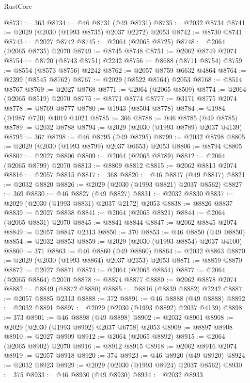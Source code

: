 \begin{lexlean}{RustCore}
\begin{coremodule}
@8731 := 363
@8734 := @46 @8731 (@49 @8731)
@8735 := @2032 @8734
@8741 := @2029 (@2030 (@1993 @8735) @2037 @2272) @2053
@8742 := @8730 @8741
@8743 := @2027 @8742
@8745 := @2064 (@2065 @8725)
@8748 := @2064 (@2065 @8735) @2070
@8749 := @8745 @8748
@8751 := @2062 @8749 @2074
@8754 := @8720 (@8743 @8751) @2242
@8756 := @8688 (@8711 @8754)
@8759 := @8554 (@8573 @8756) @2242
@8762 := @2057 @8759 @6632 @4864
@8764 := @2399 (@8545 @8762)
@8767 := @2029 (@8522 @8764) @2053
@8768 := @8514 @8767
@8769 := @2027 @8768
@8771 := @2064 (@2065 @8509)
@8774 := @2064 (@2065 @8519) @2070
@8775 := @8771 @8774
@8777 := @3171 @8775 @2074
@8778 := @8769 @8777
@8780 := @1943 (@8504 @8778)
@8784 := @1984 (@1987 @720) @4019 @4021
@8785 := 366
@8788 := @46 @8785 (@49 @8785)
@8789 := @2032 @8788
@8794 := @2029 (@2030 (@1993 @8789) @2037 @4139)
@8795 := 367
@8798 := @46 @8795 (@49 @8795)
@8799 := @2032 @8798
@8805 := @2029 (@2030 (@1993 @8799) @2037 @6653) @2053
@8806 := @8794 @8805
@8807 := @2027 @8806
@8809 := @2064 (@2065 @8789)
@8812 := @2064 (@2065 @8799) @2070
@8813 := @8809 @8812
@8815 := @2062 @8813 @2074
@8816 := @2057 @8815
@8817 := 368
@8820 := @46 @8817 (@49 @8817)
@8821 := @2032 @8820
@8826 := @2029 (@2030 (@1993 @8821) @2037 @8562)
@8827 := 369
@8830 := @46 @8827 (@49 @8827)
@8831 := @2032 @8830
@8837 := @2029 (@2030 (@1993 @8831) @2037 @2172) @2053
@8838 := @8826 @8837
@8839 := @2027 @8838
@8841 := @2064 (@2065 @8821)
@8844 := @2064 (@2065 @8831) @2070
@8845 := @8841 @8844
@8847 := @2062 @8845 @2074
@8849 := @2057 @8847 @2313
@8850 := 370
@8853 := @46 @8850 (@49 @8850)
@8854 := @2032 @8853
@8859 := @2029 (@2030 (@1993 @8854) @2037 @4100)
@8860 := 371
@8863 := @46 @8860 (@49 @8860)
@8864 := @2032 @8863
@8870 := @2029 (@2030 (@1993 @8864) @2037 @2353) @2053
@8871 := @8859 @8870
@8872 := @2027 @8871
@8874 := @2064 (@2065 @8854)
@8877 := @2064 (@2065 @8864) @2070
@8878 := @8874 @8877
@8880 := @2062 @8878 @2074
@8882 := @8849 (@8872 @8880)
@8885 := @8816 (@8839 @8882) @2242
@8887 := @2057 @8885 @2313
@8888 := 372
@8891 := @46 @8888 (@49 @8888)
@8892 := @2032 @8891
@8897 := @2029 (@2030 (@1993 @8892) @2037 @4139)
@8898 := 373
@8901 := @46 @8898 (@49 @8898)
@8902 := @2032 @8901
@8908 := @2029 (@2030 (@1993 @8902) @2037 @6758) @2053
@8909 := @8897 @8908
@8910 := @2027 @8909
@8912 := @2064 (@2065 @8892)
@8915 := @2064 (@2065 @8902) @2070
@8916 := @8912 @8915
@8918 := @2062 @8916 @2074
@8919 := @2057 @8918
@8920 := 374
@8923 := @46 @8920 (@49 @8920)
@8924 := @2032 @8923
@8929 := @2029 (@2030 (@1993 @8924) @2037 @8562)
@8930 := 375
@8933 := @46 @8930 (@49 @8930)
@8934 := @2032 @8933

\end{coremodule}
\end{lexlean}
